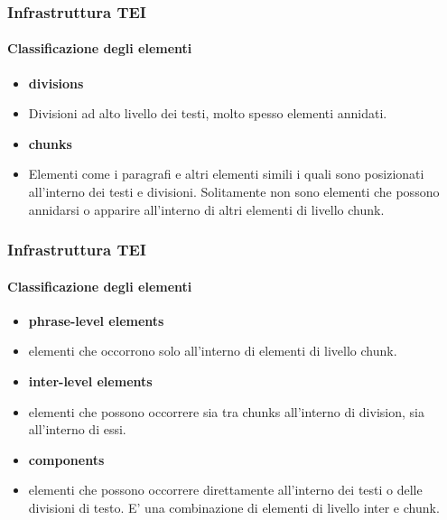 \begin{frame}
    \frametitle{Infrastruttura TEI}
    \framesubtitle{Classificazione degli elementi}
    \addtocounter{nframe}{1}
   
    \begin{itemize}
       \item \textbf{divisions}
       \item[] Divisioni ad alto livello dei testi, molto spesso elementi annidati.
    \end{itemize}

   \begin{itemize}
    \item \textbf{chunks}
    \item[] Elementi come i paragrafi e altri elementi simili i quali sono posizionati all'interno dei testi e divisioni. Solitamente non sono elementi che possono annidarsi o apparire all'interno di altri elementi di livello chunk.
    \end{itemize}

\end{frame}


\begin{frame}
    \frametitle{Infrastruttura TEI}
    \framesubtitle{Classificazione degli elementi}
    \addtocounter{nframe}{1}
   

    \begin{itemize}
        \item \textbf{phrase-level elements}
        \item[] elementi che occorrono solo all'interno di elementi di livello chunk.
     \end{itemize}
 
    \begin{itemize}
     \item \textbf{inter-level elements}
     \item[] elementi che possono occorrere sia tra chunks all'interno di division, sia all'interno di essi.
     \end{itemize}

     \begin{itemize}
        \item \textbf{components}
        \item[] elementi che possono occorrere direttamente all'interno dei testi o delle divisioni di testo. E' una combinazione di elementi di livello inter e chunk.
        \end{itemize}
   
\end{frame}


